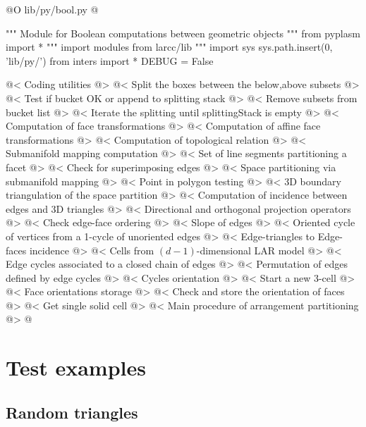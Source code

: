 \documentclass[11pt,oneside]{article}    %
\begin{document}
@O lib/py/bool.py
@{""" Module for Boolean computations between geometric objects """
from pyplasm import *
""" import modules from larcc/lib """
import sys
sys.path.insert(0, 'lib/py/')
from inters import *
DEBUG = False

@< Coding utilities @>
@< Split the boxes between the below,above subsets @>
@< Test if bucket OK or append to splitting stack @>
@< Remove subsets from bucket list @>
@< Iterate the splitting until splittingStack is empty @>
@< Computation of face transformations @>
@< Computation of affine face transformations @>
@< Computation of topological relation @>
@< Submanifold mapping computation @>
@< Set of line segments partitioning a facet @>
@< Check for superimposing edges @>
@< Space partitioning via submanifold mapping @>
@< Point in polygon testing @>
@< 3D boundary triangulation of the space partition @>
@< Computation of incidence between edges and 3D triangles @>
@< Directional and orthogonal projection operators @>
@< Check edge-face ordering @>
@< Slope of edges @>
@< Oriented cycle of vertices from a 1-cycle of unoriented edges @>
@< Edge-triangles to Edge-faces incidence @>
@< Cells from $(d-1)$-dimensional LAR model @>
@< Edge cycles associated to a closed chain of edges @>
@< Permutation of edges defined by edge cycles @>
@< Cycles orientation @>
@< Start a new 3-cell @>
@< Face orientations storage @>
@< Check and store the orientation of faces @>
@< Get single solid cell @>
@< Main procedure of arrangement partitioning @>
@}
    
\section{Test examples}

\subsection{Random triangles}
\end{document}
